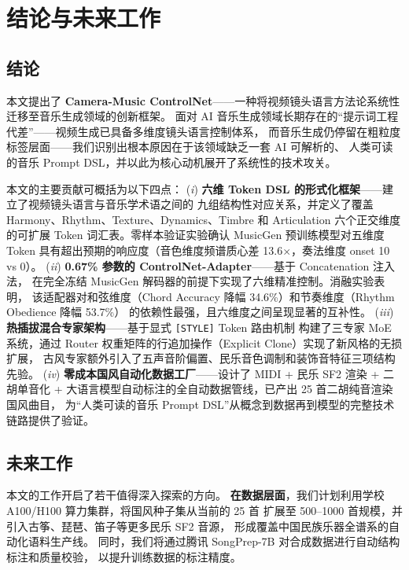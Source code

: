 \section{结论与未来工作}

\subsection{结论}

本文提出了 \textbf{Camera-Music ControlNet}——一种将视频镜头语言方法论系统性迁移至音乐生成领域的创新框架。
面对 AI 音乐生成领域长期存在的“提示词工程代差”——视频生成已具备多维度镜头语言控制体系，
而音乐生成仍停留在粗粒度标签层面——我们识别出根本原因在于该领域缺乏一套 AI 可解析的、
人类可读的音乐 Prompt DSL，并以此为核心动机展开了系统性的技术攻关。

本文的主要贡献可概括为以下四点：
(\textit{i}) \textbf{六维 Token DSL 的形式化框架}——建立了视频镜头语言与音乐学术语之间的
九组结构性对应关系，并定义了覆盖 Harmony、Rhythm、Texture、Dynamics、Timbre 和 Articulation
六个正交维度的可扩展 Token 词汇表。零样本验证实验确认 MusicGen 预训练模型对五维度 Token
具有超出预期的响应度（音色维度频谱质心差 13.6$\times$，奏法维度 onset 10 vs 0）。
(\textit{ii}) \textbf{0.67\% 参数的 ControlNet-Adapter}——基于 Concatenation 注入法，
在完全冻结 MusicGen 解码器的前提下实现了六维精准控制。消融实验表明，
该适配器对和弦维度（Chord Accuracy 降幅 34.6\%）和节奏维度（Rhythm Obedience 降幅 53.7\%）
的依赖性最强，且六维度之间呈现显著的互补性。
(\textit{iii}) \textbf{热插拔混合专家架构}——基于显式 \texttt{[STYLE]} Token 路由机制
构建了三专家 MoE 系统，通过 Router 权重矩阵的行追加操作（Explicit Clone）实现了新风格的无损扩展，
古风专家额外引入了五声音阶偏置、民乐音色调制和装饰音特征三项结构先验。
(\textit{iv}) \textbf{零成本国风自动化数据工厂}——设计了 MIDI + 民乐 SF2 渲染 + 二胡单音化
+ 大语言模型自动标注的全自动数据管线，已产出 25 首二胡纯音渲染国风曲目，
为“人类可读的音乐 Prompt DSL”从概念到数据再到模型的完整技术链路提供了验证。

\subsection{未来工作}

本文的工作开启了若干值得深入探索的方向。
\textbf{在数据层面}，我们计划利用学校 A100/H100 算力集群，将国风种子集从当前的 25 首
扩展至 500--1000 首规模，并引入古筝、琵琶、笛子等更多民乐 SF2 音源，
形成覆盖中国民族乐器全谱系的自动化语料生产线。
同时，我们将通过腾讯 SongPrep-7B\cite{songprep} 对合成数据进行自动结构标注和质量校验，
以提升训练数据的标注精度。

